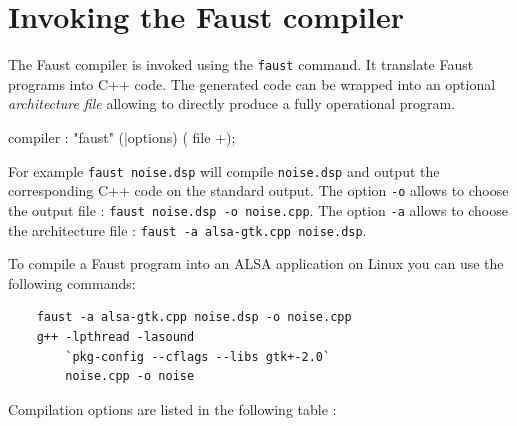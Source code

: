 \documentclass[a4paper]{book}
\begin{document}
\chapter{Invoking the Faust compiler}
The Faust compiler is invoked using the \texttt{faust} command. It translate Faust programs into C++ code.
The generated code can be wrapped into an optional \emph{architecture file} allowing to directly produce a fully operational program.

\begin{syntdiag}
compiler : "faust" (|options) ( file +);
\end{syntdiag}

For example \lstinline'faust noise.dsp' will compile \lstinline'noise.dsp' and output the corresponding C++ code on the standard output.  The option \lstinline'-o' allows to choose the output file : \lstinline'faust noise.dsp -o noise.cpp'. The option \lstinline'-a' allows to choose the architecture file : \lstinline'faust -a alsa-gtk.cpp noise.dsp'. 

To compile a Faust program into an ALSA application on Linux you can use the following commands: 
\begin{lstlisting}
	faust -a alsa-gtk.cpp noise.dsp -o noise.cpp
	g++ -lpthread -lasound  
		`pkg-config --cflags --libs gtk+-2.0` 
		noise.cpp -o noise
\end{lstlisting} 


Compilation options are listed in the following table :

\vspace{5 mm}
\end{document}
